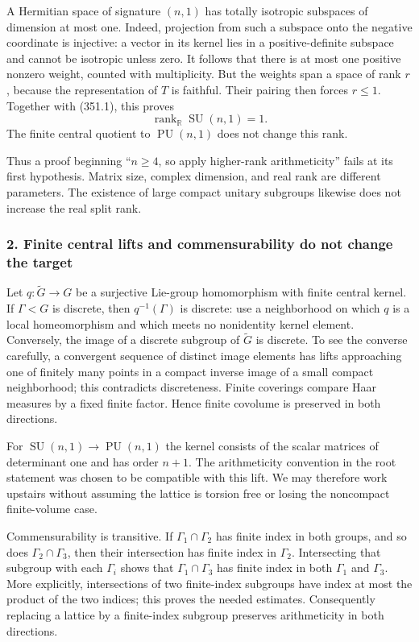 \documentclass[11pt]{article}
\begin{document}
A Hermitian space of signature $(n,1)$ has totally isotropic subspaces of dimension at most one. Indeed, projection from such a subspace onto the negative coordinate is injective: a vector in its kernel lies in a positive-definite subspace and cannot be isotropic unless zero. It follows that there is at most one positive nonzero weight, counted with multiplicity. But the weights span a space of rank $r$, because the representation of $T$ is faithful. Their pairing then forces $r\le1$. Together with (351.1), this proves
\[
 \operatorname{rank}_{\mathbb R}\operatorname{SU}(n,1)=1.
 \tag{351.2}
\]
The finite central quotient to $\operatorname{PU}(n,1)$ does not change this rank.

Thus a proof beginning ``$n\ge4$, so apply higher-rank arithmeticity'' fails at its first hypothesis. Matrix size, complex dimension, and real rank are different parameters. The existence of large compact unitary subgroups likewise does not increase the real split rank.

\subsubsection{2. Finite central lifts and commensurability do not change the target}
Let $q:\widetilde G\to G$ be a surjective Lie-group homomorphism with finite central kernel. If $\Gamma<G$ is discrete, then $q^{-1}(\Gamma)$ is discrete: use a neighborhood on which $q$ is a local homeomorphism and which meets no nonidentity kernel element. Conversely, the image of a discrete subgroup of $\widetilde G$ is discrete. To see the converse carefully, a convergent sequence of distinct image elements has lifts approaching one of finitely many points in a compact inverse image of a small compact neighborhood; this contradicts discreteness. Finite coverings compare Haar measures by a fixed finite factor. Hence finite covolume is preserved in both directions.

For $\operatorname{SU}(n,1)\to\operatorname{PU}(n,1)$ the kernel consists of the scalar matrices of determinant one and has order $n+1$. The arithmeticity convention in the root statement was chosen to be compatible with this lift. We may therefore work upstairs without assuming the lattice is torsion free or losing the noncompact finite-volume case.

Commensurability is transitive. If $\Gamma_1\cap\Gamma_2$ has finite index in both groups, and so does $\Gamma_2\cap\Gamma_3$, then their intersection has finite index in $\Gamma_2$. Intersecting that subgroup with each $\Gamma_i$ shows that $\Gamma_1\cap\Gamma_3$ has finite index in both $\Gamma_1$ and $\Gamma_3$. More explicitly, intersections of two finite-index subgroups have index at most the product of the two indices; this proves the needed estimates. Consequently replacing a lattice by a finite-index subgroup preserves arithmeticity in both directions.
\end{document}
